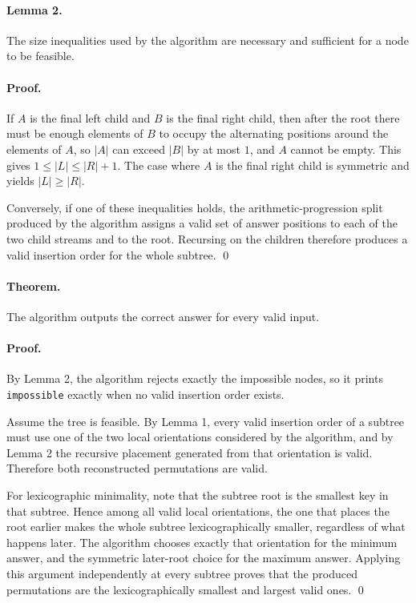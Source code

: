 \documentclass[11pt]{article}
\begin{document}
\paragraph{Lemma 2.}
The size inequalities used by the algorithm are necessary and sufficient for a node to be feasible.

\paragraph{Proof.}
If $A$ is the final left child and $B$ is the final right child, then after the root there must be enough
elements of $B$ to occupy the alternating positions around the elements of $A$, so $|A|$ can exceed
$|B|$ by at most $1$, and $A$ cannot be empty. This gives $1 \le |L| \le |R|+1$.
The case where $A$ is the final right child is symmetric and yields $|L| \ge |R|$.

Conversely, if one of these inequalities holds, the arithmetic-progression split produced by the
algorithm assigns a valid set of answer positions to each of the two child streams and to the root.
Recursing on the children therefore produces a valid insertion order for the whole subtree. \qed

\paragraph{Theorem.}
The algorithm outputs the correct answer for every valid input.

\paragraph{Proof.}
By Lemma 2, the algorithm rejects exactly the impossible nodes, so it prints \texttt{impossible} exactly
when no valid insertion order exists.

Assume the tree is feasible. By Lemma 1, every valid insertion order of a subtree must use one of the
two local orientations considered by the algorithm, and by Lemma 2 the recursive placement generated
from that orientation is valid. Therefore both reconstructed permutations are valid.

For lexicographic minimality, note that the subtree root is the smallest key in that subtree. Hence among
all valid local orientations, the one that places the root earlier makes the whole subtree lexicographically
smaller, regardless of what happens later. The algorithm chooses exactly that orientation for the minimum
answer, and the symmetric later-root choice for the maximum answer. Applying this argument
independently at every subtree proves that the produced permutations are the lexicographically smallest
and largest valid ones. \qed
\end{document}
